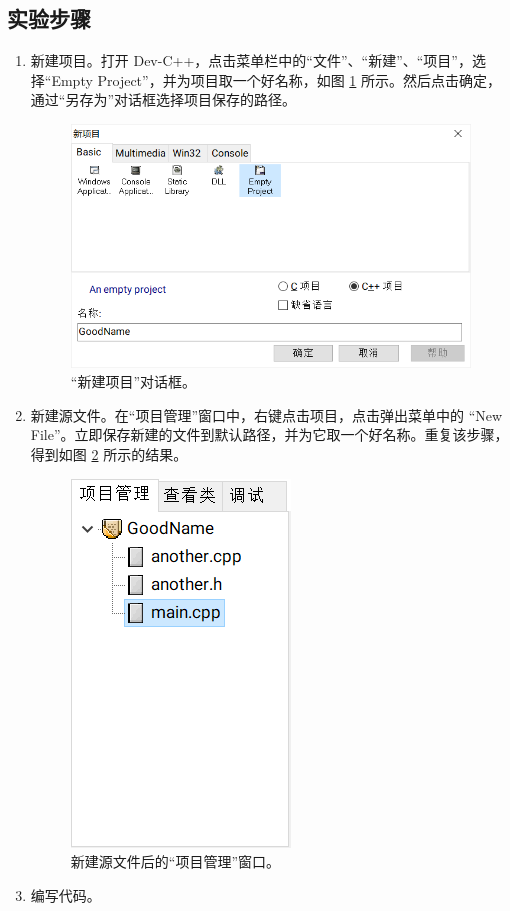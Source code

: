 \subsection*{实验步骤}

\begin{enumerate}
	\item 新建项目。打开 Dev-C++，点击菜单栏中的“文件”、“新建”、“项目”，选择“Empty Project”，并为项目取一个好名称，如图 \ref{fig:multi-source-1} 所示。然后点击确定，通过“另存为”对话框选择项目保存的路径。

	\begin{figure}[H]
		\centering
		\includegraphics[width=0.75\linewidth]{assets/multi-source-1}
		\caption{“新建项目”对话框。}
		\label{fig:multi-source-1}
	\end{figure}

	\item 新建源文件。\label{item:exp-1-2}在“项目管理”窗口中，右键点击项目，点击弹出菜单中的 “New File”。立即保存新建的文件到默认路径，并为它取一个好名称。重复该步骤，得到如图 \ref{fig:multi-source-2} 所示的结果。

	\begin{figure}[H]
		\centering
		\includegraphics[width=0.2\linewidth]{assets/multi-source-2}
		\caption{新建源文件后的“项目管理”窗口。}
		\label{fig:multi-source-2}
	\end{figure}

	\item 编写代码。


\end{enumerate}
